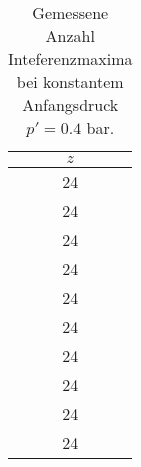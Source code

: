 \begin{table}[!htp]
\centering
\caption{Gemessene Anzahl Inteferenzmaxima bei konstantem Anfangsdruck $p' = 0.4$ bar.}
\label{tab:messung2}
\begin{tabular}{c}
\toprule
{$z$} \\
\midrule
24 \\
24 \\
24 \\
24 \\
24 \\
24 \\
24 \\
24 \\
24 \\
24 \\
\bottomrule
\end{tabular}
\end{table}
